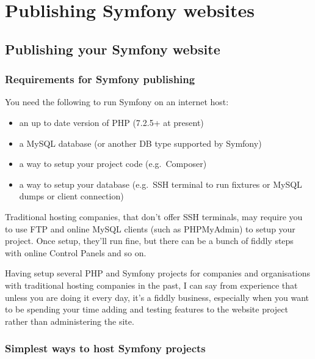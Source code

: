 \documentclass[a4paperpaper,openright]{book}
\begin{document}
\part{Publishing Symfony websites}

\hypertarget{publishing-your-symfony-website}{%
\chapter{Publishing your Symfony
website}\label{publishing-your-symfony-website}}

\hypertarget{requirements-for-symfony-publishing}{%
\section{Requirements for Symfony
publishing}\label{requirements-for-symfony-publishing}}

You need the following to run Symfony on an internet host:

\begin{itemize}
\item
  an up to date version of PHP (7.2.5+ at present)
\item
  a MySQL database (or another DB type supported by Symfony)
\item
  a way to setup your project code (e.g.~Composer)
\item
  a way to setup your database (e.g.~SSH terminal to run fixtures or
  MySQL dumps or client connection)
\end{itemize}

Traditional hosting companies, that don't offer SSH terminals, may
require you to use FTP and online MySQL clients (such as PHPMyAdmin) to
setup your project. Once setup, they'll run fine, but there can be a
bunch of fiddly steps with online Control Panels and so on.

Having setup several PHP and Symfony projects for companies and
organisations with traditional hosting companies in the past, I can say
from experience that unless you are doing it every day, it's a fiddly
business, especially when you want to be spending your time adding and
testing features to the website project rather than administering the
site.

\hypertarget{simplest-ways-to-host-symfony-projects}{%
\section{Simplest ways to host Symfony
projects}\label{simplest-ways-to-host-symfony-projects}}
\end{document}
